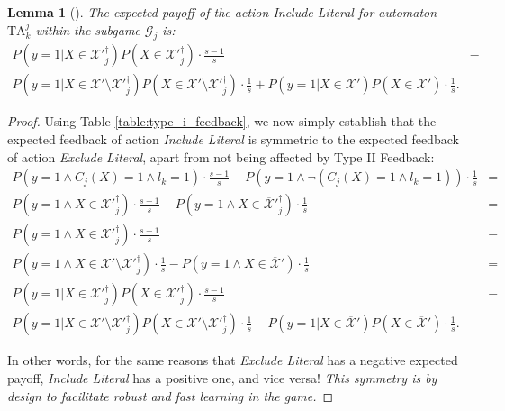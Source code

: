 \documentclass[11pt,a4paper]{article}
\newcommand{\True}{\mbox{1}}
\newtheorem{mylemma}{Lemma}
\begin{document}
\begin{mylemma}[]\label{lemma:include_literal}
The expected payoff of the action \emph{Include Literal} for automaton $\mathrm{TA}^j_k$ within the subgame $\mathcal{G}_j$ is:
\begin{eqnarray}
P(y = \True | X \in \mathcal{X}'^{\dagger}_j)P(X \in \mathcal{X}'^{\dagger}_j) \cdot \frac{s-1}{s}
&-&\nonumber \\
P(y = \True | X \in \mathcal{X}' \setminus \mathcal{X}'^{\dagger}_j) P(X \in \mathcal{X}' \setminus \mathcal{X}'^{\dagger}_j) \cdot \frac{1}{s} + P(y = \True | X \in \overline{\mathcal{X}}') P(X \in \overline{\mathcal{X}}') \cdot \frac{1}{s}.
\end{eqnarray}
\end{mylemma}
\begin{proof}
Using Table \ref{table:type_i_feedback}, we now simply establish that the expected feedback of action \emph{Include Literal} is symmetric to the expected feedback of action \emph{Exclude Literal}, apart from not being affected by Type II Feedback:
\begin{eqnarray}
P(y = \True \land C_j(X) = \True \land l_k = \True) \cdot \frac{s-1}{s} - P(y = \True \land \lnot (C_j(X) = \True \land l_k = \True))\cdot \frac{1}{s}&=&\\
P(y = \True \land X \in \mathcal{X}'^{\dagger}_j) \cdot \frac{s-1}{s} - P(y = \True \land X \in \overline{\mathcal{X}}'^{\dagger}_j) \cdot \frac{1}{s}&=&\\
P(y = \True \land X \in \mathcal{X}'^{\dagger}_j) \cdot \frac{s-1}{s}&-&\nonumber\\
P(y = \True \land X \in \mathcal{X}' \setminus \mathcal{X}'^{\dagger}_j) \cdot \frac{1}{s} - P(y = \True \land X \in \overline{\mathcal{X}}') \cdot \frac{1}{s}&=&\\
P(y = \True | X \in \mathcal{X}'^{\dagger}_j)P(X \in \mathcal{X}'^{\dagger}_j) \cdot \frac{s-1}{s}
 &-&\nonumber\\
 P(y = \True | X \in \mathcal{X}' \setminus \mathcal{X}'^{\dagger}_j) P(X \in \mathcal{X}' \setminus \mathcal{X}'^{\dagger}_j) \cdot \frac{1}{s} - P(y = \True | X \in \overline{\mathcal{X}}') P(X \in \overline{\mathcal{X}}') \cdot \frac{1}{s}.
\end{eqnarray}

In other words, for the same reasons that \emph{Exclude Literal} has a negative expected payoff, \emph{Include Literal} has a positive one, and vice versa! \emph{This symmetry is by design to facilitate robust and fast learning in the game.}
\end{proof}
\end{document}
